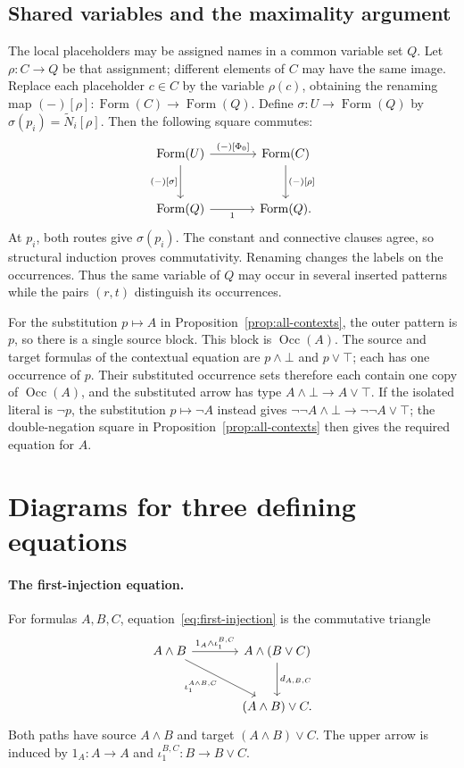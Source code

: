 \documentclass[11pt]{article}
\newcommand{\Occ}{\operatorname{Occ}}
\newcommand{\FormulaSet}{\operatorname{Form}}
\begin{document}
\subsection{Shared variables and the maximality argument}\label{app:shared}

The local placeholders may be assigned names in a common variable
set $Q$. Let $\rho:C\to Q$ be that assignment; different elements
of $C$ may have the same image. Replace each placeholder $c\in C$
by the variable $\rho(c)$, obtaining the renaming map
$(-)[\rho]:\FormulaSet(C)\to\FormulaSet(Q)$. Define
$\sigma:U\to\FormulaSet(Q)$ by
$\sigma(p_i)=\widetilde N_i[\rho]$.
Then the following square commutes:
\begin{equation}\label{eq:app-renaming}
\begin{tikzcd}[column sep=large,row sep=large]
 \FormulaSet(U)\arrow[r,"{(-)[\Phi_0]}"]
    \arrow[d,"{(-)[\sigma]}"']
   &\FormulaSet(C)\arrow[d,"{(-)[\rho]}"]\\
 \FormulaSet(Q)\arrow[r,"1"']&\FormulaSet(Q).
\end{tikzcd}
\end{equation}
At $p_i$, both routes give $\sigma(p_i)$. The constant and connective
clauses agree, so structural induction proves commutativity.
Renaming changes the labels on the occurrences. Thus the same variable
of $Q$ may occur in several inserted patterns while the pairs $(r,t)$
distinguish its occurrences.

For the substitution $p\mapsto A$ in
Proposition~\ref{prop:all-contexts}, the outer pattern is $p$,
so there is a single source block. This block is $\Occ(A)$.
The source and target formulas of the contextual equation are
$p\wedge\bot$ and $p\vee\top$; each has one occurrence of $p$. Their substituted occurrence sets therefore each
contain one copy of $\Occ(A)$, and the substituted arrow has type
$A\wedge\bot\to A\vee\top$. If the isolated literal is $\neg p$,
the substitution $p\mapsto\neg A$ instead gives
$\neg\neg A\wedge\bot\to\neg\neg A\vee\top$; the
double-negation square in Proposition~\ref{prop:all-contexts}
then gives the required equation for $A$.

\section{Diagrams for three defining equations}
\label{app:structural-diagrams}

\paragraph{The first-injection equation.}
For formulas $A,B,C$, equation~\eqref{eq:first-injection} is the
commutative triangle
\[
\begin{tikzcd}[column sep=large,row sep=large]
 A\wedge B
   \arrow[r,"1_A\wedge\iota_1^{B,C}"]
   \arrow[dr,"{\iota_1^{A\wedge B,C}}"']
   &A\wedge(B\vee C)\arrow[d,"d_{A,B,C}"]\\
   &(A\wedge B)\vee C.
\end{tikzcd}
\]
Both paths have source $A\wedge B$ and target $(A\wedge B)\vee C$.
The upper arrow is induced by $1_A:A\to A$ and
$\iota_1^{B,C}:B\to B\vee C$.
\end{document}
